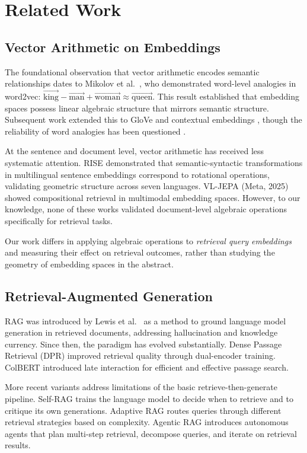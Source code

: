 \documentclass{article}
\begin{document}
\section{Related Work}

\subsection{Vector Arithmetic on Embeddings}

The foundational observation that vector arithmetic encodes semantic relationships dates to Mikolov et al.\ \cite{mikolov2013}, who demonstrated word-level analogies in word2vec: $\vec{\text{king}} - \vec{\text{man}} + \vec{\text{woman}} \approx \vec{\text{queen}}$. This result established that embedding spaces possess linear algebraic structure that mirrors semantic structure. Subsequent work extended this to GloVe \cite{pennington2014} and contextual embeddings \cite{peters2018}, though the reliability of word analogies has been questioned \cite{rogers2017}.

At the sentence and document level, vector arithmetic has received less systematic attention. RISE \cite{rise2025} demonstrated that semantic-syntactic transformations in multilingual sentence embeddings correspond to rotational operations, validating geometric structure across seven languages. VL-JEPA (Meta, 2025) showed compositional retrieval in multimodal embedding spaces. However, to our knowledge, none of these works validated document-level algebraic operations specifically for retrieval tasks.

Our work differs in applying algebraic operations to \emph{retrieval query embeddings} and measuring their effect on retrieval outcomes, rather than studying the geometry of embedding spaces in the abstract.

\subsection{Retrieval-Augmented Generation}

RAG was introduced by Lewis et al.\ \cite{lewis2020} as a method to ground language model generation in retrieved documents, addressing hallucination and knowledge currency. Since then, the paradigm has evolved substantially. Dense Passage Retrieval (DPR) \cite{karpukhin2020} improved retrieval quality through dual-encoder training. ColBERT \cite{khattab2020} introduced late interaction for efficient and effective passage search.

More recent variants address limitations of the basic retrieve-then-generate pipeline. Self-RAG \cite{asai2024} trains the language model to decide when to retrieve and to critique its own generations. Adaptive RAG \cite{jeong2024} routes queries through different retrieval strategies based on complexity. Agentic RAG \cite{arag2026,agenticrag2025} introduces autonomous agents that plan multi-step retrieval, decompose queries, and iterate on retrieval results.
\end{document}
